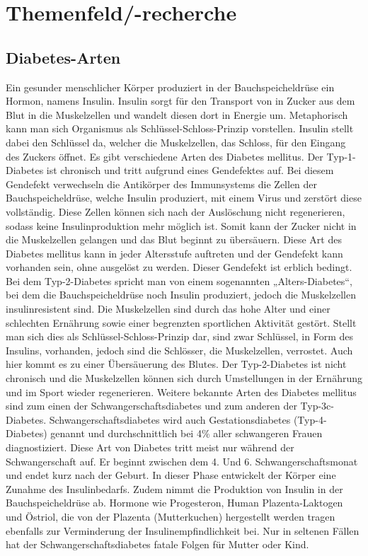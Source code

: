 \documentclass[a4paper,11pt]{article}%
\renewcommand{\\}{\vspace*{0.5\baselineskip} \newline}
\begin{document}
	
	\section{Themenfeld/-recherche}
	\label{section:Themenfeld}
	\subsection{Diabetes-Arten}
	Ein gesunder menschlicher Körper produziert in der Bauchspeicheldrüse ein Hormon, namens Insulin. Insulin sorgt für den Transport von in Zucker aus dem Blut in die Muskelzellen und wandelt diesen dort in Energie um. Metaphorisch kann man sich Organismus als Schlüssel-Schloss-Prinzip vorstellen. Insulin stellt dabei den Schlüssel da, welcher die Muskelzellen, das Schloss, für den Eingang des Zuckers öffnet. Es gibt verschiedene Arten des Diabetes mellitus. \\	
	Der Typ-1-Diabetes ist chronisch und tritt aufgrund eines Gendefektes auf. Bei diesem Gendefekt verwechseln die Antikörper des Immunsystems die Zellen der Bauchspeicheldrüse, welche Insulin produziert, mit einem Virus und zerstört diese vollständig. Diese Zellen können sich nach der Auslöschung nicht regenerieren, sodass keine Insulinproduktion mehr möglich ist. Somit kann der Zucker nicht in die Muskelzellen gelangen und das Blut beginnt zu übersäuern. Diese Art des Diabetes mellitus kann in jeder Altersstufe auftreten und der Gendefekt kann vorhanden sein, ohne ausgelöst zu werden. Dieser Gendefekt ist erblich bedingt.\\
	Bei dem Typ-2-Diabetes spricht man von einem sogenannten „Alters-Diabetes“, bei dem die Bauchspeicheldrüse noch Insulin produziert, jedoch die Muskelzellen insulinresistent sind. Die Muskelzellen sind durch das hohe Alter und einer schlechten Ernährung sowie einer begrenzten sportlichen Aktivität gestört. Stellt man sich dies als Schlüssel-Schloss-Prinzip dar, sind zwar Schlüssel, in Form des Insulins, vorhanden, jedoch sind die Schlösser, die Muskelzellen, verrostet. Auch hier kommt es zu einer Übersäuerung des Blutes. Der Typ-2-Diabetes ist nicht chronisch und die Muskelzellen können sich durch Umstellungen in der Ernährung und im Sport wieder regenerieren.\\
	Weitere bekannte Arten des Diabetes mellitus sind zum einen der Schwangerschaftsdiabetes und zum anderen der Typ-3c-Diabetes.\newline
	Schwangerschaftsdiabetes wird auch Gestationsdiabetes (Typ-4-Diabetes) genannt und durchschnittlich bei 4\% aller schwangeren Frauen diagnostiziert. Diese Art von Diabetes tritt meist nur während der Schwangerschaft auf. Er beginnt zwischen dem 4. Und 6. Schwangerschaftsmonat und endet kurz nach der Geburt. In dieser Phase entwickelt der Körper eine Zunahme des Insulinbedarfs. Zudem nimmt die Produktion von Insulin in der Bauchspeicheldrüse ab. Hormone wie Progesteron, Human Plazenta-Laktogen und Östriol, die von der Plazenta (Mutterkuchen) hergestellt werden tragen ebenfalls zur Verminderung der Insulinempfindlichkeit bei. Nur in seltenen Fällen hat der Schwangerschaftsdiabetes fatale Folgen für Mutter oder Kind.\\
\end{document}
